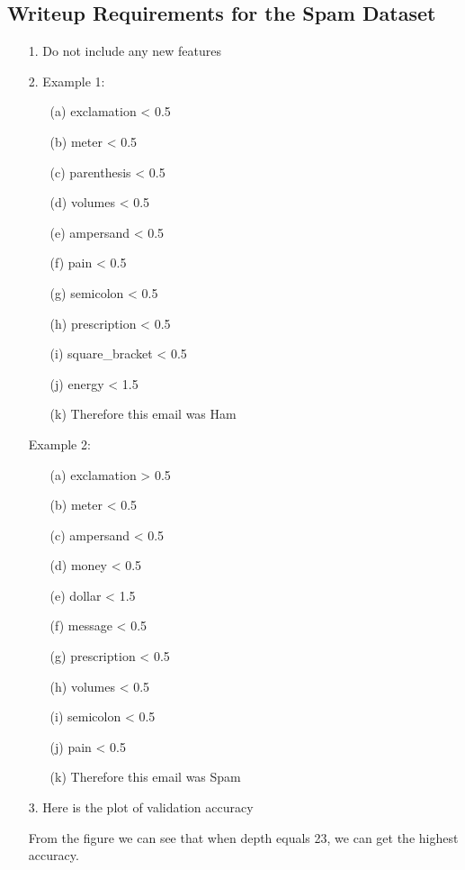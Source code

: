 \documentclass[a4paper,12pt]{article}
\begin{document}
\subsection{Writeup Requirements for the Spam Dataset}
\begin{itemize}
\item[1.] Do not include any new features

\item[2.]
Example 1:
\begin{itemize}
\item[(a)] exclamation < 0.5
\item[(b)] meter < 0.5
\item[(c)] parenthesis < 0.5
\item[(d)] volumes < 0.5
\item[(e)] ampersand < 0.5
\item[(f)] pain < 0.5
\item[(g)] semicolon < 0.5
\item[(h)] prescription < 0.5
\item[(i)] square\_bracket < 0.5
\item[(j)] energy < 1.5
\item[(k)]Therefore this email was Ham
\end{itemize}
Example 2:
\begin{itemize}
\item[(a)]exclamation > 0.5
\item[(b)]meter < 0.5
\item[(c)]ampersand < 0.5
\item[(d)]money < 0.5
\item[(e)]dollar < 1.5
\item[(f)]message < 0.5
\item[(g)]prescription < 0.5
\item[(h)]volumes < 0.5
\item[(i)]semicolon < 0.5
\item[(j)]pain < 0.5
\item[(k)]Therefore this email was Spam
\end{itemize}

\item[3.]
Here is the plot of validation accuracy
  \begin{center}
    \end{center}
From the figure we can see that when depth equals 23, we can get the highest accuracy.
\end{itemize}
\end{document}
